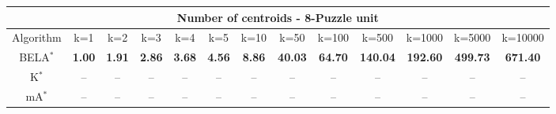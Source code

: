 \begin{tabular}{c|cccccccccccc}\toprule
\multicolumn{13}{c}{Number of centroids - 8-Puzzle unit}\\ \midrule
Algorithm & k=1 & k=2 & k=3 & k=4 & k=5 & k=10 & k=50 & k=100 & k=500 & k=1000 & k=5000 & k=10000 \\ \midrule
BELA$^*$ & \textbf{1.00} & \textbf{1.91} & \textbf{2.86} & \textbf{3.68} & \textbf{4.56} & \textbf{8.86} & \textbf{40.03} & \textbf{64.70} & \textbf{140.04} & \textbf{192.60} & \textbf{499.73} & \textbf{671.40} \\
K$^*$ & -- & -- & -- & -- & -- & -- & -- & -- & -- & -- & -- & -- \\
mA$^*$ & -- & -- & -- & -- & -- & -- & -- & -- & -- & -- & -- & -- \\ \bottomrule 
\end{tabular}
